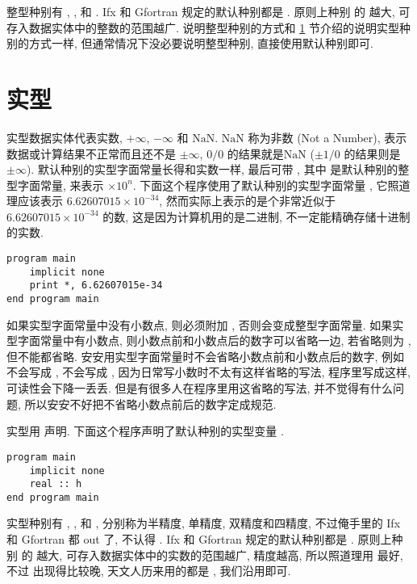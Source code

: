 整型种别有 , ,  和 . Ifx 和 Gfortran 规定的默认种别都是 . 原则上种别  的  越大, 可存入数据实体中的整数的范围越广. 说明整型种别的方式和 \ref{fortran_real} 节介绍的说明实型种别的方式一样, 但通常情况下没必要说明整型种别, 直接使用默认种别即可.

\section{实型}\label{fortran_real}

实型数据实体代表实数, $+\infty$, $-\infty$ 和 $\text{NaN}$. $\text{NaN}$ 称为非数 (Not a Number), 表示数据或计算结果不正常而且还不是 $\pm\infty$, $0/0$ 的结果就是$\text{NaN}$ ($\pm 1/0$ 的结果则是 $\pm\infty$). 默认种别的实型字面常量长得和实数一样, 最后可带 , 其中 \ttt{[n]} 是默认种别的整型字面常量, 来表示 $\times 10 ^ n$. 下面这个程序使用了默认种别的实型字面常量 , 它照道理应该表示 $6.62607015\times10^{-34}$, 然而实际上表示的是个非常近似于 $6.62607015\times10^{-34}$ 的数, 这是因为计算机用的是二进制, 不一定能精确存储十进制的实数.
\begin{lstlisting}
program main
    implicit none
    print *, 6.62607015e-34
end program main
\end{lstlisting}

如果实型字面常量中没有小数点, 则必须附加 , 否则会变成整型字面常量. 如果实型字面常量中有小数点, 则小数点前和小数点后的数字可以省略一边, 若省略则为 , 但不能都省略. 安安用实型字面常量时不会省略小数点前和小数点后的数字, 例如  不会写成 ,  不会写成 , 因为日常写小数时不太有这样省略的写法, 程序里写成这样, 可读性会下降一丢丢. 但是有很多人在程序里用这省略的写法, 并不觉得有什么问题, 所以安安不好把不省略小数点前后的数字定成规范. 

实型用  声明. 下面这个程序声明了默认种别的实型变量 .
\begin{lstlisting}
program main
    implicit none
    real :: h
end program main
\end{lstlisting}

实型种别有 , ,  和 , 分别称为半精度, 单精度, 双精度和四精度, 不过俺手里的 Ifx 和 Gfortran 都 out 了, 不认得 . Ifx 和 Gfortran 规定的默认种别都是 . 原则上种别  的  越大, 可存入数据实体中的实数的范围越广, 精度越高, 所以照道理用  最好, 不过  出现得比较晚, 天文人历来用的都是 , 我们沿用即可.

